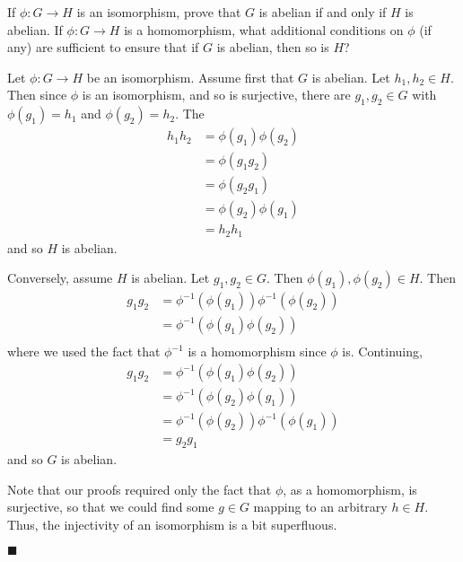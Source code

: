 \documentclass[12pt]{article}
\renewcommand{\qed}{\hfill$\blacksquare$}
\renewenvironment{proof}{\begin{addmargin}[1em]{0em}\begin{newproof}}{\end{newproof}\end{addmargin}\qed}
\newenvironment{problem}[2][Exercise]{\begin{trivlist}
\item[\hskip \labelsep {\bfseries #1}\hskip \labelsep {\bfseries #2.}]}{\end{trivlist}}
\begin{document}
\begin{problem}{1.6.3}
If $\phi:G\rightarrow H$ is an isomorphism, prove that $G$ is abelian if and only if $H$ is abelian. If $\phi:G\rightarrow H$ is a homomorphism, what additional conditions on $\phi$ (if any) are sufficient to ensure that if $G$ is abelian, then so is $H$?
\end{problem}
\begin{proof}
Let $\phi:G\rightarrow H$ be an isomorphism. Assume first that $G$ is abelian. Let $h_1,h_2\in H$. Then since $\phi$ is an isomorphism, and so is surjective, there are $g_1,g_2\in G$ with $\phi\left(g_1\right)=h_1$ and $\phi\left(g_2\right)=h_2$. The
\begin{equation*}
    \begin{split}
        h_1 h_2 & = \phi\left(g_1\right)\phi\left(g_2\right) \\
        & = \phi\left(g_1g_2\right) \\
        & = \phi\left(g_2g_1\right) \\
        & = \phi\left(g_2\right)\phi\left(g_1\right) \\
        & = h_2 h_1
    \end{split}
\end{equation*}
and so $H$ is abelian.

Conversely, assume $H$ is abelian. Let $g_1,g_2\in G$. Then $\phi\left(g_1\right), \phi\left(g_2\right) \in H$. Then
\begin{equation*}
    \begin{split}
        g_1 g_2 & = \phi^{-1}\left(\phi\left(g_1\right)\right)\phi^{-1}\left(\phi\left(g_2\right)\right) \\
        & = \phi^{-1}\left(\phi\left(g_1\right)\phi\left(g_2\right)\right) \\
    \end{split}
\end{equation*}
where we used the fact that $\phi^{-1}$ is a homomorphism since $\phi$ is. Continuing,
\begin{equation*}
    \begin{split}
        g_1 g_2 & = \phi^{-1}\left(\phi\left(g_1\right)\phi\left(g_2\right)\right) \\
        & = \phi^{-1}\left(\phi\left(g_2\right)\phi\left(g_1\right)\right) \\
        & = \phi^{-1}\left(\phi\left(g_2\right)\right)\phi^{-1}\left(\phi\left(g_1\right)\right) \\
        & = g_2 g_1
    \end{split}
\end{equation*}
and so $G$ is abelian.

Note that our proofs required only the fact that $\phi$, as a homomorphism, is surjective, so that we could find some $g\in G$ mapping to an arbitrary $h\in H$. Thus, the injectivity of an isomorphism is a bit superfluous.
\end{proof}
\end{document}

